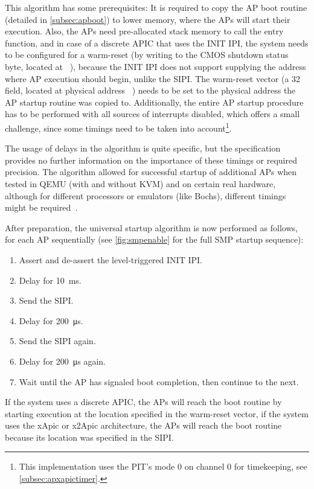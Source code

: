 This algorithm has some prerequisites: It is required to copy the AP boot routine (detailed in \autoref{subsec:apboot}) to lower memory, where the APs will start their execution.
Also, the APs need pre-allocated stack memory to call the entry function, and in case of a discrete APIC that uses the INIT IPI, the system needs to be configured for a warm-reset (by writing  to the CMOS shutdown status byte, located at ~\autocite[sec.~B.4]{mpspec}), because the INIT IPI does not support supplying the address where AP execution should begin, unlike the SIPI\@.
The warm-reset vector (a \SI{32}{\bit} field, located at physical address ~\autocite[sec.~B.4]{mpspec}) needs to be set to the physical address the AP startup routine was copied to.
Additionally, the entire AP startup procedure has to be performed with all sources of interrupts disabled, which offers a small challenge, since some timings need to be taken into account\footnote{
  This implementation uses the PIT's mode 0 on channel 0 for timekeeping, see \autoref{subsec:apxapictimer}.}.

The usage of delays in the algorithm is quite specific, but the specification provides no further information on the importance of these timings or required precision.
The algorithm allowed for successful startup of additional APs when tested in QEMU (with and without KVM) and on certain real hardware, although for different processors or emulators (like Bochs), different timings might be required~\autocite[lapic.c]{xv6}.

After preparation, the universal startup algorithm is now performed as follows, for each AP sequentially (see \autoref{fig:smpenable} for the full SMP startup sequence):

\begin{enumerate}
  \item Assert and de-assert the level-triggered INIT IPI\@.
  \item Delay for \SI{10}{\milli\second}.
  \item Send the SIPI\@.
  \item Delay for \SI{200}{\micro\second}.
  \item Send the SIPI again.
  \item Delay for \SI{200}{\micro\second} again.
  \item Wait until the AP has signaled boot completion, then continue to the next.
\end{enumerate}

If the system uses a discrete APIC, the APs will reach the boot routine by starting execution at the location specified in the warm-reset vector, if the system uses the xApic or x2Apic architecture, the APs will reach the boot routine because its location was specified in the SIPI\@.

